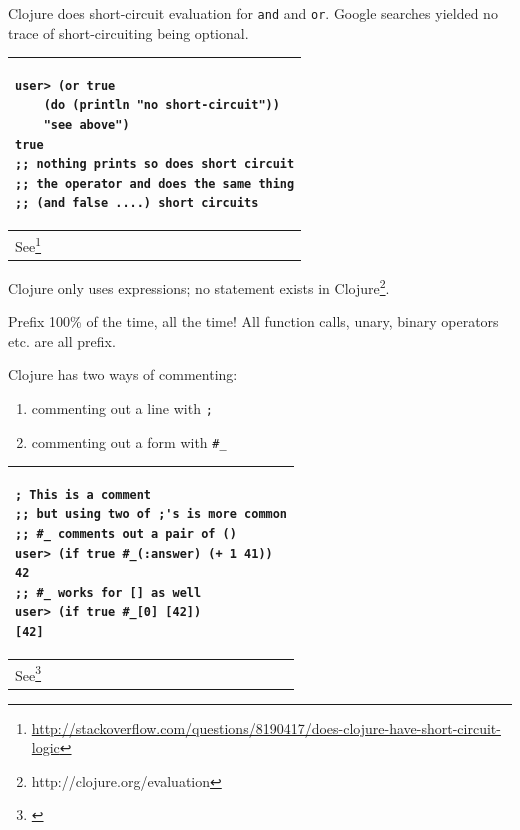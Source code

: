 \documentclass[12pt]{article}
\begin{document}
Clojure does short-circuit evaluation for \texttt{and} and \texttt{or}. Google searches yielded no trace of short-circuiting being optional.

\begin{tabular}{|p{}|}
\hline
\begin{verbatim}
user> (or true 
    (do (println "no short-circuit")) 
    "see above")
true
;; nothing prints so does short circuit
;; the operator and does the same thing
;; (and false ....) short circuits
\end{verbatim}
\\
\hline
See\footnote{\url{http://stackoverflow.com/questions/8190417/does-clojure-have-short-circuit-logic}}
\\
\hline
\end{tabular}



Clojure only uses expressions; no statement exists in Clojure\footnote{http://clojure.org/evaluation}.




Prefix 100\% of the time, all the time\cite{fogus2014joy}! All function calls, unary, binary operators etc. are all prefix.



Clojure has two ways of commenting:
\begin{enumerate}
\item commenting out a line with \texttt{;}
\item commenting out a form with \texttt{\#\_}
\end{enumerate}

\begin{tabular}{|p{}|}
\hline
\begin{verbatim}
; This is a comment
;; but using two of ;'s is more common
;; #_ comments out a pair of ()
user> (if true #_(:answer) (+ 1 41))
42
;; #_ works for [] as well
user> (if true #_[0] [42])
[42]
\end{verbatim}
\\
\hline
See\footnote{\url{}}
\\
\hline
\end{tabular}



\end{document}
